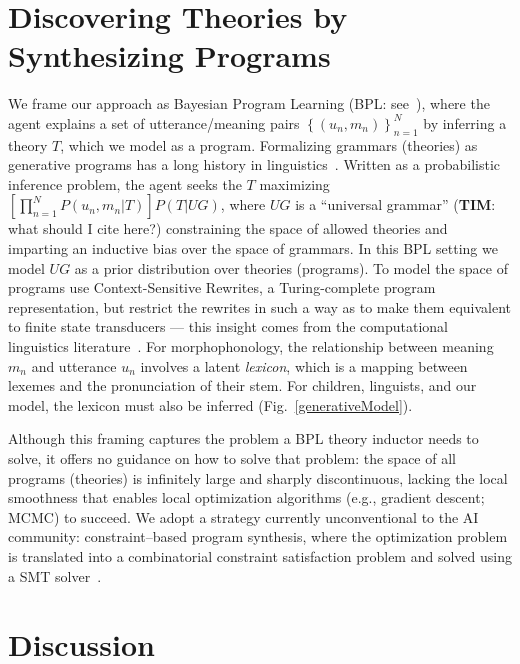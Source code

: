 \documentclass[12pt]{article}
\begin{document}
\section*{Discovering Theories by Synthesizing Programs}

We frame our approach as Bayesian Program Learning (BPL: see~\cite{lake2015human}),
where the agent explains a
set of utterance/meaning pairs $\left\{(u_n,m_n) \right\}_{n = 1}^N$
by inferring a theory $T$, which we model as a program.
Formalizing grammars (theories) as generative programs has a long history in linguistics~\cite{chomsky1968sound}.
Written as a probabilistic inference problem, the agent seeks the $T$ maximizing $\left[\prod_{n = 1}^N P(u_n,m_n | T) \right] P(T|UG)$,
where $UG$ is a ``universal grammar'' (\textbf{TIM}: what should I cite here?)
constraining the space of allowed theories and imparting an inductive bias over the space of grammars.
In this BPL setting we model $UG$ as a prior distribution over theories (programs).
To model the space of programs
use Context-Sensitive Rewrites,
a Turing-complete program representation,
but restrict the rewrites
in such a way as to make them equivalent to finite state transducers --- this insight comes from the computational linguistics literature~\cite{beesley2003finite}.
For morphophonology,
the relationship between meaning $m_n$ and utterance $u_n$
involves a latent \emph{lexicon},
which is a mapping between lexemes and the pronunciation of their stem.
For children, linguists, and our model, the lexicon
must also be inferred (Fig.~\ref{generativeModel}).



Although this framing captures the problem a BPL theory inductor needs to solve,
it offers no guidance on how to solve that problem:
the space of all programs (theories) is infinitely large and
sharply discontinuous, lacking the local smoothness that
enables local optimization algorithms (e.g., gradient descent; MCMC)
to succeed.
We adopt a strategy currently unconventional to the
AI community: constraint--based program synthesis,
where the optimization problem is translated
into a combinatorial constraint satisfaction 
problem and solved using
a SMT solver~\cite{solar2006combinatorial}.





\section*{Discussion}
\end{document}
